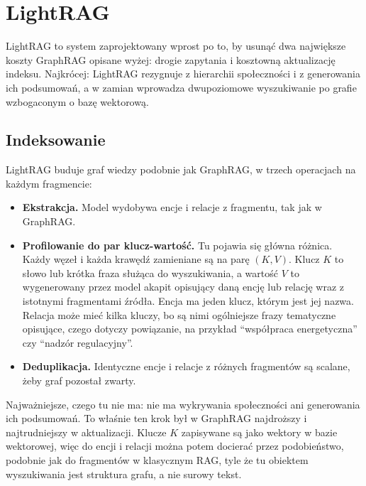 \documentclass[11pt,a4paper]{article}
\begin{document}
\section{LightRAG}

LightRAG \cite{guo2024} to system zaprojektowany wprost po to, by usunąć dwa największe
koszty GraphRAG opisane wyżej: drogie zapytania i kosztowną aktualizację indeksu.
Najkrócej: LightRAG rezygnuje z hierarchii społeczności i z generowania ich
podsumowań, a w zamian wprowadza dwupoziomowe wyszukiwanie po grafie wzbogaconym o bazę
wektorową.

\subsection{Indeksowanie}

LightRAG buduje graf wiedzy podobnie jak GraphRAG, w trzech operacjach na każdym fragmencie:

\begin{itemize}[itemsep=3pt]
  \item \textbf{Ekstrakcja.} Model wydobywa encje i relacje z fragmentu, tak jak w GraphRAG.
  \item \textbf{Profilowanie do par klucz-wartość.} Tu pojawia się główna różnica. Każdy
        węzeł i każda krawędź zamieniane są na parę $(K, V)$. Klucz $K$ to słowo lub krótka
        fraza służąca do wyszukiwania, a wartość $V$ to wygenerowany przez model akapit
        opisujący daną encję lub relację wraz z istotnymi fragmentami źródła. Encja ma jeden
        klucz, którym jest jej nazwa. Relacja może mieć kilka kluczy, bo są nimi
        ogólniejsze frazy tematyczne opisujące, czego dotyczy powiązanie, na przykład
        \enquote{współpraca energetyczna} czy \enquote{nadzór regulacyjny}.
  \item \textbf{Deduplikacja.} Identyczne encje i relacje z różnych fragmentów są scalane,
        żeby graf pozostał zwarty.
\end{itemize}

Najważniejsze, czego tu nie ma: nie ma wykrywania społeczności ani generowania ich
podsumowań. To właśnie ten krok był w GraphRAG najdroższy i najtrudniejszy w aktualizacji.
Klucze $K$ zapisywane są jako wektory w bazie wektorowej, więc do encji i relacji można potem
docierać przez podobieństwo, podobnie jak do fragmentów w klasycznym RAG, tyle że tu obiektem
wyszukiwania jest struktura grafu, a nie surowy tekst.
\end{document}
